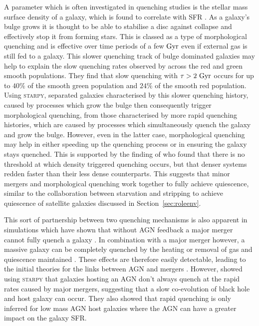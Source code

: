 \documentclass[useAMS,usenatbib]{mn2e}
\begin{document}
A parameter which is often investigated in quenching studies is the stellar mass surface density of a galaxy, which is found to correlate with SFR \citep{barro13b, whitaker16}. As a galaxy's bulge grows it is thought to be able to stabilise a disc against collapse and effectively stop it from forming stars. This is classed as a type of morphological quenching and is effective over time periods of a few $\rm{Gyr}$ \citep{Fang13} even if external gas is still fed to a galaxy. This slower quenching track of bulge dominated galaxies may help to explain the slow quenching rates observed by \cite{smethurst15} across the red and green smooth populations. They find that slow quenching with $\tau>2~\rm{Gyr}$ occurs for up to $40\%$ of the smooth green population and $24\%$ of the smooth red population. Using \textsc{starpy}, \cite{smethurst15} separated galaxies characterised by this slower quenching history, caused by processes which grow the bulge then consequently trigger morphological quenching, from those characterised by more rapid quenching histories, which are caused by processes which simultaneously quench the galaxy and grow the bulge. However, even in the latter case, morphological quenching may help in either speeding up the quenching process or in ensuring the galaxy stays quenched. This is supported by the finding of \cite{abramson16} who found that there is no threshold at which density triggered quenching occurs, but that denser systems redden faster than their less dense counterparts. This suggests that minor mergers and morphological quenching work together to fully achieve quiescence, similar to the collaboration between starvation and stripping to achieve quiescence of satellite galaxies discussed in Section~\ref{sec:roleenv}. 

This sort of partnership between two quenching mechanisms is also apparent in simulations which have shown that without AGN feedback a major merger cannot fully quench a galaxy \citep{springel05b}. In combination with a major merger however, a massive galaxy can be completely quenched by the heating or removal of gas and quiescence maintained \citep{conselice03, springel05b, hopkins08a, pontzen16}. These effects are therefore easily detectable, leading to the initial theories for the links between AGN and mergers \citep{merritt01, hopkins06b, hopkins08a, hopkins08b, peng07, jahnke11}. However, \cite{smethurst16} showed using \textsc{starpy} that galaxies hosting an AGN don't always quench at the rapid rates caused by major mergers, suggesting that a slow co-evolution of black hole and host galaxy can occur. They also showed that rapid quenching is only inferred for low mass AGN host galaxies where the AGN can have a greater impact on the galaxy SFR. 
\end{document}
